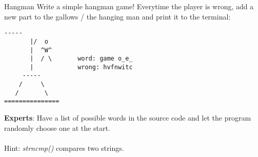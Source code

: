 \begin{frame}[fragile]{Hangman}
	Write a simple hangman game! Everytime the player is wrong,
	add a new part to the gallows / the hanging man and print it to the terminal:
	\begin{lstlisting}[numbers=none]
       -----    
       |/  o 
       |  ^W^
       |  / \		word: game o_e_
       |     		wrong: hvfnwitc
     -----   
    /     \
   /       \
===============
\end{lstlisting}
	\textbf{Experts}: Have a list of possible words in the source code and let the program randomly choose one at the start.\\
	\ \\
	Hint: \textit{strncmp()} compares two strings.
\end{frame}

